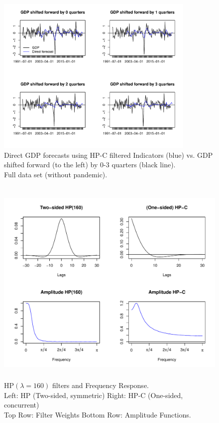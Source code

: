 \documentclass[11pt,a4paper]{article}
\begin{document}
\begin{figure}[H]
    \begin{center}
        \includegraphics[width=0.85\textwidth]{./Figures/direct_hp_forecasts.pdf}
        \caption{Direct GDP forecasts using HP-C filtered Indicators (blue) vs. GDP shifted forward (to the left) by 0-3 quarters (black line).\\ Full data set (without pandemic).
        \label{fig:direct_hp_forecasts}}
    \end{center}
\end{figure}

\begin{figure}[h]
    \begin{center}
        \includegraphics[height=4in, width=5.5in]{./Figures/hp_160.pdf}
        \caption{HP$(\lambda=160)$ filters and Frequency Response.\\
        Left: HP (Two-sided, symmetric) \qquad Right: HP-C (One-sided, concurrent)\\
        Top Row: Filter Weights \qquad \qquad \quad Bottom Row: Amplitude Functions.
        \label{fig:hp_160}}
    \end{center}
\end{figure}
\end{document}
